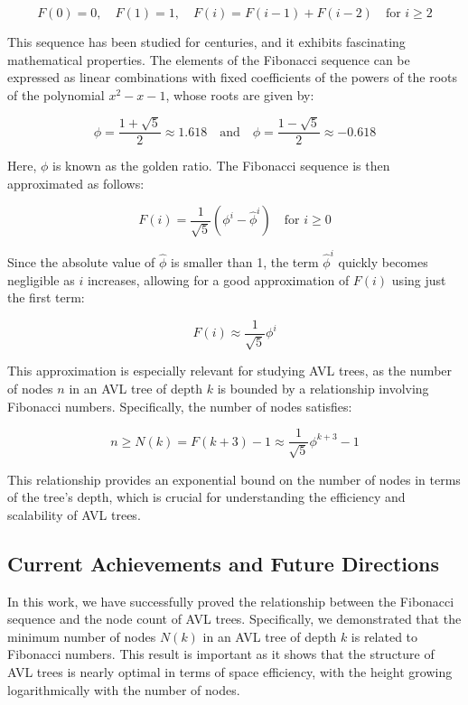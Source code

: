 \documentclass[12pt]{article}
\begin{document}
\begin{itemize}
\[
F(0) = 0, \quad F(1) = 1, \quad F(i) = F(i - 1) + F(i - 2) \quad \text{for } i \geq 2
\]

This sequence has been studied for centuries, and it exhibits fascinating mathematical properties. The elements of the Fibonacci sequence can be expressed as linear combinations with fixed coefficients of the powers of the roots of the polynomial \( x^2 - x - 1 \), whose roots are given by:

\[
\phi = \frac{1 + \sqrt{5}}{2} \approx 1.618 \quad \text{and} \quad \hat{\phi} = \frac{1 - \sqrt{5}}{2} \approx -0.618
\]

Here, \( \phi \) is known as the golden ratio. The Fibonacci sequence is then approximated as follows:

\[
F(i) = \frac{1}{\sqrt{5}} \left( \phi^i - \hat{\phi}^i \right) \quad \text{for } i \geq 0
\]

Since the absolute value of \( \hat{\phi} \) is smaller than 1, the term \( \hat{\phi}^i \) quickly becomes negligible as \( i \) increases, allowing for a good approximation of \( F(i) \) using just the first term:

\[
F(i) \approx \frac{1}{\sqrt{5}} \phi^i
\]

This approximation is especially relevant for studying AVL trees, as the number of nodes \( n \) in an AVL tree of depth \( k \) is bounded by a relationship involving Fibonacci numbers. Specifically, the number of nodes satisfies:

\[
n \geq N(k) = F(k + 3) - 1 \approx \frac{1}{\sqrt{5}} \phi^{k+3} - 1
\]

This relationship provides an exponential bound on the number of nodes in terms of the tree’s depth, which is crucial for understanding the efficiency and scalability of AVL trees.

\subsection*{Current Achievements and Future Directions}

In this work, we have successfully proved the relationship between the Fibonacci sequence and the node count of AVL trees. Specifically, we demonstrated that the minimum number of nodes \( N(k) \) in an AVL tree of depth \( k \) is related to Fibonacci numbers. This result is important as it shows that the structure of AVL trees is nearly optimal in terms of space efficiency, with the height growing logarithmically with the number of nodes.


\end{itemize}
\end{document}
